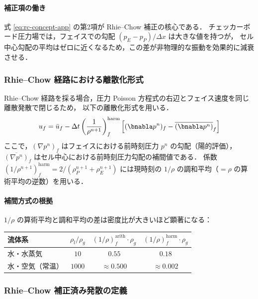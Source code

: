 \paragraph{補正項の働き}
式 \eqref{eq:rc-concept-app} の第2項が Rhie--Chow 補正の核心である．
チェッカーボード圧力場では，フェイスでの勾配 $(p_E-p_P)/\Delta x$ は大きな値を持つが，
セル中心勾配の平均はゼロに近くなるため，この差が非物理的な振動を効果的に減衰させる．

\subsubsection{Rhie--Chow 経路における離散化形式}
\label{sec:rc_implementation}
Rhie--Chow 経路を採る場合，圧力 Poisson 方程式の右辺とフェイス速度を同じ離散発散で閉じるため，
以下の離散化形式を用いる．
\begin{equation}
 u_f = \bar{u}_f - \Delta t\left( \frac{1}{\rho^{n+1}} \right)^{\mathrm{harm}}_f \left[ (\bnabla p^n)_f - \overline{(\bnabla p^n)}_f \right]
 \label{eq:rc-face}
\end{equation}
ここで，$(\nabla p^n)_f$ はフェイスにおける前時刻圧力 $p^n$ の勾配（陽的評価），
$\overline{(\nabla p^n)}_f$ はセル中心における前時刻圧力勾配の補間値である．
係数 $(1/\rho^{n+1})_f^\mathrm{harm} = 2/(\rho^{n+1}_P + \rho^{n+1}_E)$ には現時刻の $1/\rho$ の調和平均（$= \rho$ の算術平均の逆数）を用いる．

\paragraph{補間方式の根拠}
$1/\rho$ の算術平均と調和平均の差は密度比が大きいほど顕著になる：
\begin{center}
\PaperTableSetup
\begin{tabular}{lccc}
\hline
流体系 & $\rho_l/\rho_g$ & $(1/\rho)^{\mathrm{arith}}_f \cdot \rho_g$ & $(1/\rho)^{\mathrm{harm}}_f \cdot \rho_g$ \\
\hline
水・水蒸気 & $10$ & $0.55$ & $0.18$ \\
水・空気（常温） & $1000$ & $\approx 0.500$ & $\approx 0.002$ \\
\hline
\end{tabular}
\end{center}

\subsubsection{Rhie--Chow 補正済み発散の定義}
\label{sec:rc_divergence}

